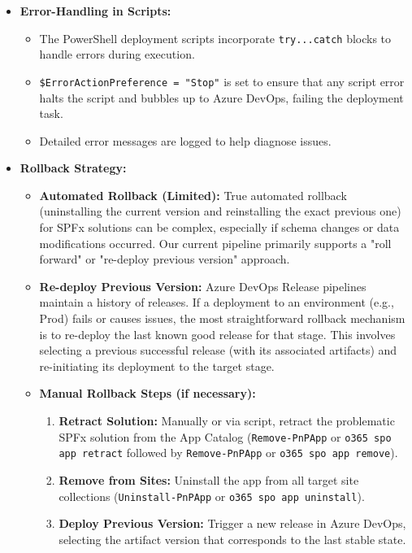 \begin{itemize}
    \item \textbf{Error-Handling in Scripts:}
    \begin{itemize}
        \item The PowerShell deployment scripts incorporate \texttt{try...catch} blocks to handle errors during execution.
        \item \texttt{\$ErrorActionPreference = "Stop"} is set to ensure that any script error halts the script and bubbles up to Azure DevOps, failing the deployment task.
        \item Detailed error messages are logged to help diagnose issues.
    \end{itemize}
    \item \textbf{Rollback Strategy:}
    \begin{itemize}
        \item \textbf{Automated Rollback (Limited):} True automated rollback (uninstalling the current version and reinstalling the exact previous one) for SPFx solutions can be complex, especially if schema changes or data modifications occurred. Our current pipeline primarily supports a "roll forward" or "re-deploy previous version" approach.
        \item \textbf{Re-deploy Previous Version:} Azure DevOps Release pipelines maintain a history of releases. If a deployment to an environment (e.g., Prod) fails or causes issues, the most straightforward rollback mechanism is to re-deploy the last known good release for that stage. This involves selecting a previous successful release (with its associated artifacts) and re-initiating its deployment to the target stage.
        \item \textbf{Manual Rollback Steps (if necessary):}
        \begin{enumerate}
            \item \textbf{Retract Solution:} Manually or via script, retract the problematic SPFx solution from the App Catalog (\texttt{Remove-PnPApp} or \texttt{o365 spo app retract} followed by \texttt{Remove-PnPApp} or \texttt{o365 spo app remove}).
            \item \textbf{Remove from Sites:} Uninstall the app from all target site collections (\texttt{Uninstall-PnPApp} or \texttt{o365 spo app uninstall}).
            \item \textbf{Deploy Previous Version:} Trigger a new release in Azure DevOps, selecting the artifact version that corresponds to the last stable state.

\end{enumerate}
\end{itemize}
\end{itemize}
